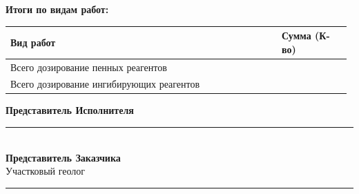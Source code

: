 \documentclass[12pt]{article}
\begin{document}
\begin{samepage}
{\fontsize{11pt}{13pt}\selectfont
\noindent\textbf{Итоги по видам работ:}\\[0.3em]
\begin{longtable}{|P{0.78\linewidth}|C{0.20\linewidth}|}
\hline
\textbf{Вид работ} & \textbf{Сумма (К-во)} \\
\hline
Всего дозирование пенных реагентов &  \\
\hline
Всего дозирование ингибирующих реагентов &  \\
\hline
\end{longtable}
} %

\vspace{1.2em}
\noindent\textbf{Представитель Исполнителя } \\
[1em]
\rule{16cm}{0.4pt} \\[2em]

\noindent\textbf{Представитель Заказчика } \\
[1em]
Участковый геолог \rule{12cm}{0.4pt}

\end{samepage}
\end{document}
